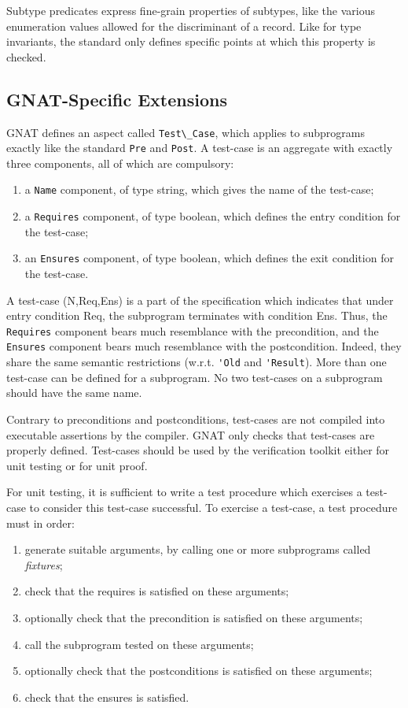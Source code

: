 \documentclass[fullpage]{article}
\begin{document}
Subtype predicates express fine-grain properties of subtypes, like the various
enumeration values allowed for the discriminant of a record. Like for type
invariants, the standard only defines specific points at which this property is
checked.

\subsection{GNAT-Specific Extensions}
\label{sub:formal-containers}

GNAT defines an aspect called \verb|Test\_Case|, which applies to subprograms
exactly like the standard \verb|Pre| and \verb|Post|. A test-case is an
aggregate with exactly three components, all of which are compulsory:
\begin{enumerate}
\item a \verb|Name| component, of type string, which gives the name of the
  test-case;
\item a \verb|Requires| component, of type boolean, which defines the entry
  condition for the test-case;
\item an \verb|Ensures| component, of type boolean, which defines the exit
  condition for the test-case.
\end{enumerate}

A test-case (N,Req,Ens) is a part of the specification which indicates that
under entry condition Req, the subprogram terminates with condition Ens. Thus,
the \verb|Requires| component bears much resemblance with the precondition, and
the \verb|Ensures| component bears much resemblance with the
postcondition. Indeed, they share the same semantic restrictions
(w.r.t. \verb|'Old| and \verb|'Result|).  More than one test-case can be
defined for a subprogram. No two test-cases on a subprogram should have the
same name.

Contrary to preconditions and postconditions, test-cases are not compiled into
executable assertions by the compiler. GNAT only checks that test-cases are
properly defined. Test-cases should be used by the verification toolkit either
for unit testing or for unit proof.

For unit testing, it is sufficient to write a test procedure which exercises a
test-case to consider this test-case successful. To exercise a test-case, a
test procedure must in order:
\begin{enumerate}
\item generate suitable arguments, by calling one or more subprograms
  called \textit{fixtures};
\item check that the requires is satisfied on these arguments;
\item optionally check that the precondition is satisfied on these arguments;
\item call the subprogram tested on these arguments;
\item optionally check that the postconditions is satisfied on these arguments;
\item check that the ensures is satisfied.
\end{enumerate}
\end{document}
